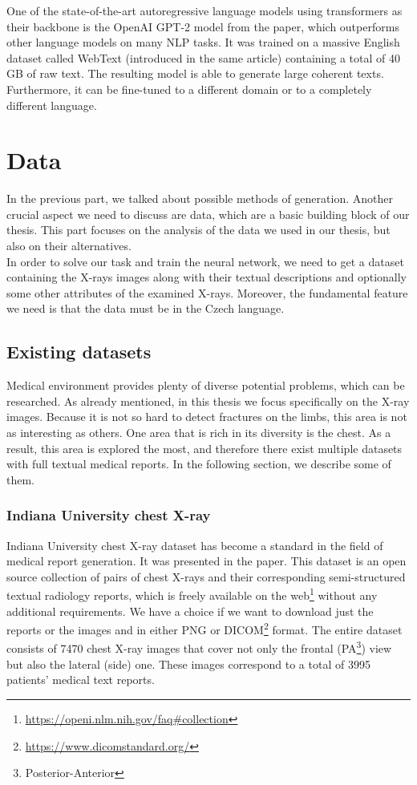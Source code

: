 One of the state-of-the-art autoregressive language models using transformers as their backbone is the OpenAI GPT-2 model from the \citet{radford2019language} paper, which outperforms other language models on many NLP tasks. It was trained on a massive English dataset called WebText (introduced in the same article) containing a total of 40 GB of raw text. The resulting model is able to generate large coherent texts. Furthermore, it can be fine-tuned to a different domain or to a completely different language.

\section{Data}
In the previous part, we talked about possible methods of generation. Another crucial aspect we need to discuss are data, which are a basic building block of our thesis. This part focuses on the analysis of the data we used in our thesis, but also on their alternatives. \\

In order to solve our task and train the neural network, we need to get a dataset containing the X-rays images along with their textual descriptions and optionally some other attributes of the examined X-rays. Moreover, the fundamental feature we need is that the data must be in the Czech language.

\subsection{Existing datasets}
\label{sec:datasets}
Medical environment provides plenty of diverse potential problems, which can be researched. As already mentioned, in this thesis we focus specifically on the X-ray images. Because it is not so hard to detect fractures on the limbs, this area is not as interesting as others. One area that is rich in its diversity is the chest. As a result, this area is explored the most, and therefore there exist multiple datasets with full textual medical reports. In the following section, we describe some of them.\\

\subsubsection{Indiana University chest X-ray}
\label{sec:IUDataset}
Indiana University chest X-ray dataset has become a standard in the field of medical report generation. It was presented in the \citet{10.1093/jamia/ocv080} paper. This dataset is an open source collection of pairs of chest X-rays and their corresponding semi-structured textual radiology reports, which is freely available on the web\footnote[1]{\url{https://openi.nlm.nih.gov/faq\#collection}} without any additional requirements. We have a choice if we want to download just the reports or the images and in either PNG or DICOM\footnote[2]{\url{https://www.dicomstandard.org/}} format. The entire dataset consists of 7470 chest X-ray images that cover not only the frontal (PA\footnote[3]{Posterior-Anterior}) view but also the lateral (side) one. These images correspond to a total of 3995 patients' medical text reports.\\

